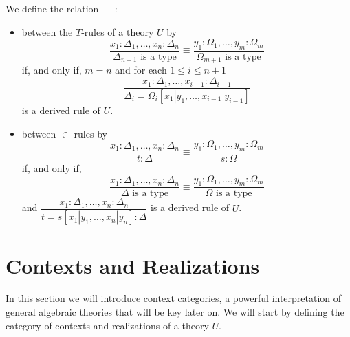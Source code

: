 We define the relation $\equiv$:
\begin{itemize}
    \item between the $T$-rules of a theory $U$ by
        \begin{equation*}
            \dfrac{
                x_1 : \Delta_1, \dots, x_n : \Delta_n
            }{
                \Delta_{n+1} \text{ is a type}
            }
            \equiv
            \dfrac{
                y_1 : \Omega_1, \dots, y_m : \Omega_m
            }{
                \Omega_{m+1} \text{ is a type}
            }
        \end{equation*}
        if, and only if, $m = n$ and for each $1 \leq i \leq n + 1$
        \begin{equation*}
            \dfrac{
                x_1 : \Delta_1, \dots, x_{i-1} : \Delta_{i-1}
            }{
                \Delta_i = \Omega_i[x_1 | y_1, \dots, x_{i-1} | y_{i-1}]
            }
        \end{equation*}
        is a derived rule of $U$.
    \item between $\in$-rules by 
        \begin{equation*}
            \dfrac{
                x_1 : \Delta_1, \dots, x_n : \Delta_n
            }{
                t : \Delta
            }
            \equiv
            \dfrac{
                y_1 : \Omega_1, \dots, y_m : \Omega_m
            }{
                s : \Omega
            }
        \end{equation*}
        if, and only if,
        \begin{equation*}
            \dfrac{
                x_1 : \Delta_1, \dots, x_n : \Delta_n
            }{
                \Delta \text{ is a type}
            }
            \equiv
            \dfrac{
                y_1 : \Omega_1, \dots, y_m : \Omega_m
            }{
                \Omega \text{ is a type}
            }
        \end{equation*}
        and \(
            \dfrac{
                x_1 : \Delta_1, \dots, x_n : \Delta_n
            }{
                t = s[x_1 | y_1, \dots, x_n | y_n] : \Delta
            }
        \) is a derived rule of $U$.
\end{itemize}

\section{Contexts and Realizations}

In this section we will introduce context categories, a powerful
interpretation of general algebraic theories that will be key 
later on. We will start by defining the category of contexts and realizations of a theory $U$.

